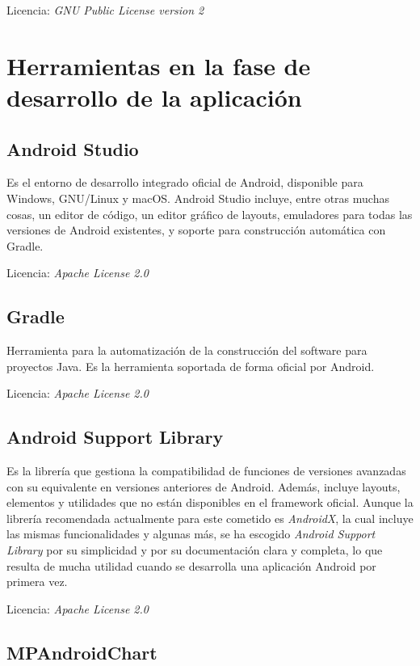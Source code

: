 Licencia: \textit{GNU Public License version 2} 

\section{Herramientas en la fase de desarrollo de la aplicación}

\subsection{Android Studio}

Es el entorno de desarrollo integrado oficial de Android, disponible para Windows, GNU/Linux y macOS. Android Studio incluye, entre otras muchas cosas, un editor de código, un editor gráfico de layouts, emuladores para todas las versiones de Android existentes, y soporte para construcción automática con Gradle. 

Licencia: \textit{Apache License 2.0}

\subsection{Gradle}

Herramienta para la automatización de la construcción del software para proyectos Java. Es la herramienta soportada de forma oficial por Android.

Licencia: \textit{Apache License 2.0} 

\subsection{Android Support Library}

Es la librería que gestiona la compatibilidad de funciones de versiones avanzadas con su equivalente en versiones anteriores de Android. Además, incluye layouts, elementos y utilidades que no están disponibles en el framework oficial. Aunque la librería recomendada actualmente para este cometido es \textit{AndroidX}, la cual incluye las mismas funcionalidades y algunas más, se ha escogido \textit{Android Support Library} por su simplicidad y por su documentación clara y completa, lo que resulta de mucha utilidad cuando se desarrolla una aplicación Android por primera vez. 

Licencia: \textit{Apache License 2.0}

\subsection{MPAndroidChart}

